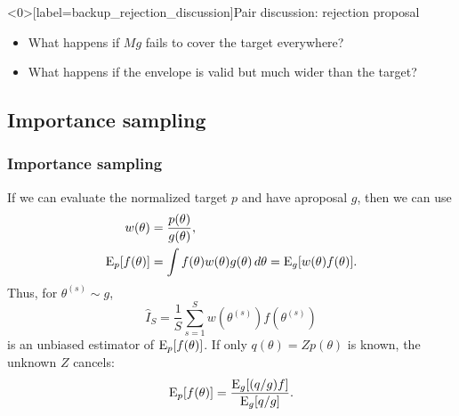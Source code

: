 \documentclass[10pt]{beamer}
\begin{document}
\begin{frame}<0>[label=backup_rejection_discussion]{Pair discussion: rejection proposal}

  \begin{itemize}
  \item What happens if $Mg$ fails to cover the target everywhere?
  \item What happens if the envelope is valid but much wider than the target?
  \end{itemize}


\end{frame}

\subsection{Importance sampling}

\begin{frame}
\frametitle{Importance sampling}

  If we can evaluate the normalized target $p$ and have aproposal $g$, then we can use 
  \begin{align*}
    w(\theta)&=\frac{p(\theta)}{g(\theta)},\\
    \mathrm{E}_p[f(\theta)]
    &=\int f(\theta)w(\theta)g(\theta)\,d\theta
      =\mathrm{E}_g[w(\theta)f(\theta)].
  \end{align*}
  \pause
  Thus, for $\theta^{(s)}\sim g$,
  \[
    \widehat I_S=\frac{1}{S}\sum_{s=1}^S
      w(\theta^{(s)})f(\theta^{(s)})
  \]
  is an unbiased estimator of $\mathrm{E}_p[f(\theta)]$.
  \pause
  If only $q(\theta)=Zp(\theta)$ is known, the unknown $Z$ cancels:
  \[
    \mathrm{E}_p[f(\theta)]
    =\frac{\mathrm{E}_g[(q/g)f]}{\mathrm{E}_g[q/g]}.
  \]

\end{frame}
\end{document}
